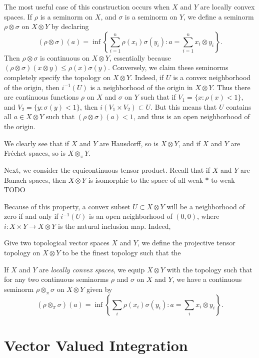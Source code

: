 The most useful case of this construction occurs when $X$ and $Y$ are locally convex spaces. If $\rho$ is a seminorm on $X$, and $\sigma$ is a seminorm on $Y$, we define a seminorm $\rho \otimes \sigma$ on $X \otimes Y$ by declaring
%
\[ (\rho \otimes \sigma)(a) = \inf \left\{ \sum_{i = 1}^n \rho(x_i) \sigma(y_i) : a = \sum_{i = 1}^n x_i \otimes y_i \right\}. \]
%
Then $\rho \otimes \sigma$ is continuous on $X \otimes Y$, essentially because $(\rho \otimes \sigma)(x \otimes y) \leq \rho(x) \sigma(y)$. Conversely, we claim these seminorms completely specify the topology on $X \otimes Y$. Indeed, if $U$ is a convex neighborhood of the origin, then $i^{-1}(U)$ is a neighborhood of the origin in $X \otimes Y$. Thus there are continuous functions $\rho$ on $X$ and $\sigma$ on $Y$ such that if $V_1 = \{ x : \rho(x) < 1 \}$, and $V_2 = \{ y: \sigma(y) < 1 \}$, then $i(V_1 \times V_2) \subset U$. But this means that $U$ contains all $a \in X \otimes Y$ such that $(\rho \otimes \sigma)(a) < 1$, and thus is an open neighborhood of the origin.

We clearly see that if $X$ and $Y$ are Hausdorff, so is $X \otimes Y$, and if $X$ and $Y$ are Fr\'{e}chet spaces, so is $X \otimes_\pi Y$.

Next, we consider the equicontinuous tensor product. Recall that if $X$ and $Y$ are Banach spaces, then $X \otimes Y$ is isomorphic to the space of all weak $*$ to weak TODO

Because of this property, a convex subset $U \subset X \otimes Y$ will be a neighborhood of zero if and only if $i^{-1}(U)$ is an open neighborhood of $(0,0)$, where $i: X \times Y \to X \otimes Y$ is the natural inclusion map. Indeed, 

Give two topological vector spaces $X$ and $Y$, we define the projective tensor topology on $X \otimes Y$ to be the finest topology such that the 

%
If $X$ and $Y$ are \emph{locally convex spaces}, we equip $X \otimes Y$ with the topology such that for any two continuous seminorms $\rho$ and $\sigma$ on $X$ and $Y$, we have a continuous seminorm $\rho \otimes_\pi \sigma$ on $X \otimes Y$ given by
%
\[ (\rho \otimes_\pi \sigma)(a) = \inf \left\{ \sum_i \rho(x_i) \sigma(y_i) : a = \sum_i x_i \otimes y_i \right\}. \]
%











\chapter{Vector Valued Integration}

